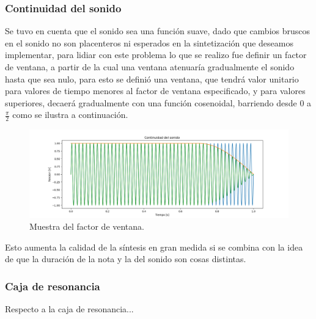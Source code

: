 \subsubsection{Continuidad del sonido}
Se tuvo en cuenta que el sonido sea una función suave, dado que cambios bruscos en el sonido no son placenteros ni esperados en la sintetización que deseamos implementar, para lidiar con este problema lo que se realizo fue definir un factor de ventana, a partir de la cual una ventana atenuaría gradualmente el sonido hasta que sea nulo, para esto se definió una ventana, que tendrá valor unitario para valores de tiempo menores al factor de ventana especificado, y para valores superiores, decaerá gradualmente con una función cosenoidal, barriendo desde 0 a $\frac{\pi}{2}$ como se ilustra a continuación.
\begin{figure}[H]
	\centering
	\includegraphics[width=1\textwidth]{ImagenesEjercicio4/continuidad.PNG}
\caption{Muestra del factor de ventana.}
	\label{fig:windowfactor}
\end{figure}
Esto aumenta la calidad de la síntesis en gran medida si se combina con la idea de que la duración de la nota y la del sonido son cosas distintas.
\subsubsection{Caja de resonancia}
Respecto a la caja de resonancia...
